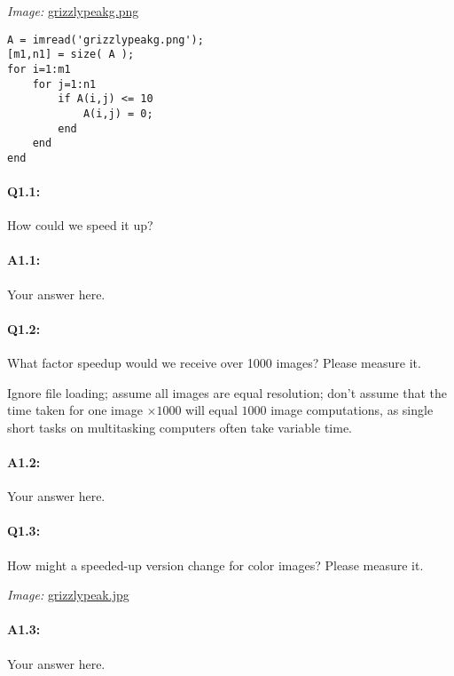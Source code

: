 \documentclass[11pt]{article}
\begin{document}
\emph{Image:} \href{grizzlypeakg.png}{grizzlypeakg.png}

\begin{lstlisting}[style=Matlab-editor]
A = imread('grizzlypeakg.png');
[m1,n1] = size( A );
for i=1:m1
    for j=1:n1
        if A(i,j) <= 10
            A(i,j) = 0;
        end
    end
end
\end{lstlisting}

\paragraph{Q1.1:} How could we speed it up?

\paragraph{A1.1:} Your answer here.




\pagebreak
\paragraph{Q1.2:} What factor speedup would we receive over 1000 images? Please measure it.

Ignore file loading; assume all images are equal resolution; don't assume that the time taken for one image $\times1000$ will equal $1000$ image computations, as single short tasks on multitasking computers often take variable time.

\paragraph{A1.2:} Your answer here.




\pagebreak
\paragraph{Q1.3:} How might a speeded-up version change for color images? Please measure it.

\emph{Image:} \href{grizzlypeak.jpg}{grizzlypeak.jpg}

\paragraph{A1.3:} Your answer here.
\end{document}
